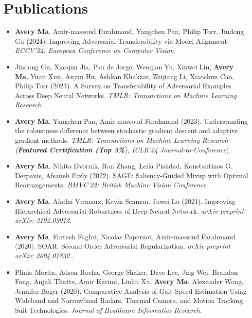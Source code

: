 \section*{Publications}
    \vspace{\postsubhead}
    \begin{adjustwidth}{\indentleft}{\indentright}
        \begin{itemize}
            \setlength\itemsep{0.6em}

            \item \textbf{Avery Ma}, Amir-massoud Farahmand, Yangchen Pan, Philip Torr, Jindong Gu (2024). Improving Adversarial Transferability via Model Alignment. \emph{ECCV'24: European Conference on Computer Vision}.

            \item Jindong Gu, Xiaojun Jia, Pau de Jorge, Wenqian Yu, Xinwei Liu, \textbf{Avery Ma}, Yuan Xun, Anjun Hu, Ashkan Khakzar, Zhijiang Li, Xiaochun Cao, Philip Torr (2023). A Survey on Transferability of Adversarial Examples Across Deep Neural Networks. \emph{TMLR: Transactions on Machine Learning Research}.
            
            \item \textbf{Avery Ma}, Yangchen Pan, Amir-massoud Farahmand (2023). Understanding the robustness difference between stochastic gradient descent and adaptive gradient methods. \emph{TMLR: Transactions on Machine Learning Research (\textbf{Featured Certification (Top 3\%}), ICLR'24 Journal-to-Conference}).
            
            \item \textbf{Avery Ma}, Nikita Dvornik, Ran Zhang, Leila Pishdad, Konstantinos G. Derpanis, Afsaneh Fazly (2022). SAGE: Saliency-Guided Mixup with Optimal Rearrangements. \emph{BMVC'22: British Machine Vision Conference}.
            
            \item \textbf{Avery Ma}, Aladin Virmaux, Kevin Scaman, Juwei Lu (2021). Improving Hierarchical Adversarial Robustness of Deep Neural Network. \emph{arXiv preprint arXiv: 2102.09012}.
            
            \item \textbf{Avery Ma}, Fartash Faghri, Nicolas Papernot, Amir-massoud Farahmand (2020). SOAR: Second-Order Adversarial Regularization. \emph{arXiv preprint arXiv: 2004.01832} .
            
            \item Plinio Morita, Adson Rocha, George Shaker, Dave Lee, Jing Wei, Brandon Fong, Anjali Thatte, Amir Karimi, Linlin Xu, \textbf{Avery Ma}, Alexander Wong, Jennifer Boger (2020). Comparative Analysis of Gait Speed Estimation Using Wideband and Narrowband Radars, Thermal Camera, and Motion Tracking Suit Technologies. \emph{Journal of Healthcare Informatics Research}.
            

\end{itemize}
\end{adjustwidth}
